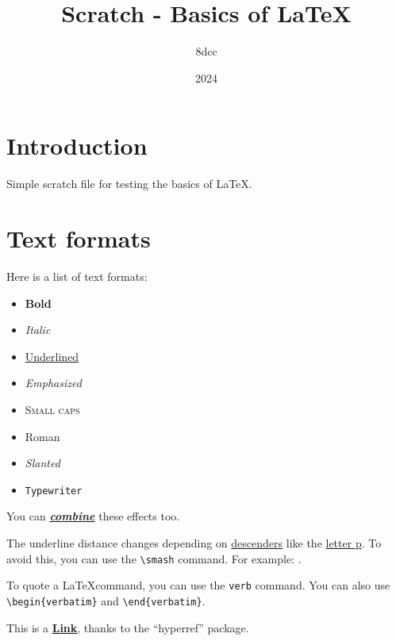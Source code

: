\documentclass{article}
\title{Scratch - Basics of \LaTeX}
\author{8dcc}
\date{2024}
\begin{document}
\maketitle
\newpage

\tableofcontents
\newpage

\section{Introduction}

Simple scratch file for testing the basics of \LaTeX.

\section{Text formats}

Here is a list of text formats:

\begin{itemize}
  \item \textbf{Bold}
  \item \textit{Italic}
  \item \underline{Underlined}
  \item \emph{Emphasized}
  \item \textsc{Small caps}
  \item \textrm{Roman}
  \item \textsl{Slanted}
  \item \texttt{Typewriter}
\end{itemize}

You can \underline{\textbf{\textit{combine}}} these effects too.

The underline distance changes depending on \underline{descenders} like the
\underline{letter p}. To avoid this, you can use the \verb|\smash| command. For
example: \underline{}.

To quote a \LaTeX command, you can use the \verb|verb| command. You can also use
\verb|\begin{verbatim}| and \verb|\end{verbatim}|.

This is a \href{http://github.com/8dcc}{\textbf{Link}}, thanks to the
``hyperref'' package.
\end{document}
